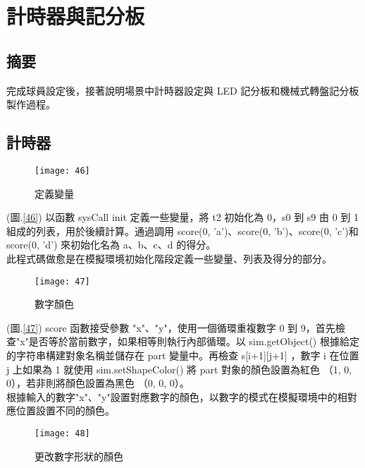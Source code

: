 \chapter{計時器與記分板}
\renewcommand{\baselinestretch}{10.0} %
\setcounter{page}{8}  %
\fontsize{14pt}{2.5pt}\sectionef
\section{摘要}
  完成球員設定後，接著說明場景中計時器設定與 LED 記分板和機械式轉盤記分板製作過程。\\
\section{計時器}
\begin{figure}[hbt!]
\begin{center}
\texttt{[image: 46]}
\caption{\Large 定義變量}\label{fig.46}
\end{center}
\end{figure}
(圖.\ref{46}) 以函數 sysCall init 定義一些變量，將 t2 初始化為 0，s0 到 s9 由 0 到 1 組成的列表，用於後續計算。通過調用 score(0, 'a')、score(0, 'b')、score(0, 'c')和 score(0, 'd') 來初始化名為 a、b、c、d 的得分。\\
  此程式碼做愈是在模擬環境初始化階段定義一些變量、列表及得分的部分。\\
\newpage
\begin{figure}[hbt!]
\begin{center}
\texttt{[image: 47]}
\caption{\Large 數字顏色}\label{fig.47}
\end{center}
\end{figure}
(圖.\ref{47}) score 函數接受參數 "x"、"y"，使用一個循環重複數字 0 到 9，首先檢查"x"是否等於當前數字，如果相等則執行內部循環。以 sim.getObject() 根據給定的字符串構建對象名稱並儲存在 part 變量中。再檢查 s[i+1][j+1] ，數字 i 在位置 j 上如果為 1 就使用 sim.setShapeColor() 將 part 對象的顏色設置為紅色 （{1, 0, 0}），若非則將顏色設置為黑色 （{0, 0, 0}）。\\
  根據輸入的數字"x"、"y"設置對應數字的顏色，以數字的模式在模擬環境中的相對應位置設置不同的顏色。\\
\newpage
\begin{figure}[hbt!]
\begin{center}
\texttt{[image: 48]}
\caption{\Large 更改數字形狀的顏色}\label{fig.48}
\end{center}
\end{figure}

